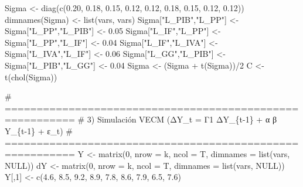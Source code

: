 \documentclass[
  spanish,
  letterpaper,
  DIV=11,
  numbers=noendperiod]{scrartcl}
\newenvironment{Shaded}{\begin{snugshade}}{\end{snugshade}}
\newcommand{\AttributeTok}[1]{\textcolor[rgb]{0.40,0.45,0.13}{#1}}
\newcommand{\CommentTok}[1]{\textcolor[rgb]{0.37,0.37,0.37}{#1}}
\newcommand{\ConstantTok}[1]{\textcolor[rgb]{0.56,0.35,0.01}{#1}}
\newcommand{\DecValTok}[1]{\textcolor[rgb]{0.68,0.00,0.00}{#1}}
\newcommand{\FloatTok}[1]{\textcolor[rgb]{0.68,0.00,0.00}{#1}}
\newcommand{\FunctionTok}[1]{\textcolor[rgb]{0.28,0.35,0.67}{#1}}
\newcommand{\NormalTok}[1]{\textcolor[rgb]{0.00,0.23,0.31}{#1}}
\newcommand{\OtherTok}[1]{\textcolor[rgb]{0.00,0.23,0.31}{#1}}
\newcommand{\SpecialCharTok}[1]{\textcolor[rgb]{0.37,0.37,0.37}{#1}}
\newcommand{\StringTok}[1]{\textcolor[rgb]{0.13,0.47,0.30}{#1}}
\begin{document}
\begin{Shaded}
\begin{Highlighting}[]
\NormalTok{Sigma }\OtherTok{\textless{}{-}} \FunctionTok{diag}\NormalTok{(}\FunctionTok{c}\NormalTok{(}\FloatTok{0.20}\NormalTok{, }\FloatTok{0.18}\NormalTok{, }\FloatTok{0.15}\NormalTok{, }\FloatTok{0.12}\NormalTok{, }\FloatTok{0.12}\NormalTok{, }\FloatTok{0.18}\NormalTok{, }\FloatTok{0.15}\NormalTok{, }\FloatTok{0.12}\NormalTok{, }\FloatTok{0.12}\NormalTok{))}
\FunctionTok{dimnames}\NormalTok{(Sigma) }\OtherTok{\textless{}{-}} \FunctionTok{list}\NormalTok{(vars, vars)}
\NormalTok{Sigma[}\StringTok{"L\_PIB"}\NormalTok{,}\StringTok{"L\_PP"}\NormalTok{] }\OtherTok{\textless{}{-}}\NormalTok{ Sigma[}\StringTok{"L\_PP"}\NormalTok{,}\StringTok{"L\_PIB"}\NormalTok{] }\OtherTok{\textless{}{-}} \FloatTok{0.05}
\NormalTok{Sigma[}\StringTok{"L\_IF"}\NormalTok{,}\StringTok{"L\_PP"}\NormalTok{]  }\OtherTok{\textless{}{-}}\NormalTok{ Sigma[}\StringTok{"L\_PP"}\NormalTok{,}\StringTok{"L\_IF"}\NormalTok{]  }\OtherTok{\textless{}{-}} \FloatTok{0.04}
\NormalTok{Sigma[}\StringTok{"L\_IF"}\NormalTok{,}\StringTok{"L\_IVA"}\NormalTok{] }\OtherTok{\textless{}{-}}\NormalTok{ Sigma[}\StringTok{"L\_IVA"}\NormalTok{,}\StringTok{"L\_IF"}\NormalTok{] }\OtherTok{\textless{}{-}} \FloatTok{0.06}
\NormalTok{Sigma[}\StringTok{"L\_GG"}\NormalTok{,}\StringTok{"L\_PIB"}\NormalTok{] }\OtherTok{\textless{}{-}}\NormalTok{ Sigma[}\StringTok{"L\_PIB"}\NormalTok{,}\StringTok{"L\_GG"}\NormalTok{] }\OtherTok{\textless{}{-}} \FloatTok{0.04}
\NormalTok{Sigma }\OtherTok{\textless{}{-}}\NormalTok{ (Sigma }\SpecialCharTok{+} \FunctionTok{t}\NormalTok{(Sigma))}\SpecialCharTok{/}\DecValTok{2}
\NormalTok{C }\OtherTok{\textless{}{-}} \FunctionTok{t}\NormalTok{(}\FunctionTok{chol}\NormalTok{(Sigma))}

\CommentTok{\# =========================================================}
\CommentTok{\# 3) Simulación VECM (ΔY\_t = Γ1 ΔY\_\{t{-}1\} + α β\textquotesingle{} Y\_\{t{-}1\} + ε\_t)}
\CommentTok{\# =========================================================}
\NormalTok{Y  }\OtherTok{\textless{}{-}} \FunctionTok{matrix}\NormalTok{(}\DecValTok{0}\NormalTok{, }\AttributeTok{nrow =}\NormalTok{ k, }\AttributeTok{ncol =}\NormalTok{ T, }\AttributeTok{dimnames =} \FunctionTok{list}\NormalTok{(vars, }\ConstantTok{NULL}\NormalTok{))}
\NormalTok{dY }\OtherTok{\textless{}{-}} \FunctionTok{matrix}\NormalTok{(}\DecValTok{0}\NormalTok{, }\AttributeTok{nrow =}\NormalTok{ k, }\AttributeTok{ncol =}\NormalTok{ T, }\AttributeTok{dimnames =} \FunctionTok{list}\NormalTok{(vars, }\ConstantTok{NULL}\NormalTok{))}
\NormalTok{Y[,}\DecValTok{1}\NormalTok{] }\OtherTok{\textless{}{-}} \FunctionTok{c}\NormalTok{(}\FloatTok{4.6}\NormalTok{, }\FloatTok{8.5}\NormalTok{, }\FloatTok{9.2}\NormalTok{, }\FloatTok{8.9}\NormalTok{, }\FloatTok{7.8}\NormalTok{, }\FloatTok{8.6}\NormalTok{, }\FloatTok{7.9}\NormalTok{, }\FloatTok{6.5}\NormalTok{, }\FloatTok{7.6}\NormalTok{)}


\end{Highlighting}
\end{Shaded}
\end{document}
